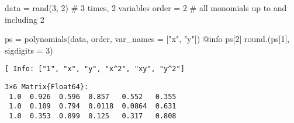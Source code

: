 \documentclass[
]{article}
\newenvironment{Shaded}{\begin{snugshade}}{\end{snugshade}}
\newcommand{\CommentTok}[1]{\textcolor[rgb]{0.37,0.37,0.37}{#1}}
\newcommand{\FloatTok}[1]{\textcolor[rgb]{0.68,0.00,0.00}{#1}}
\newcommand{\FunctionTok}[1]{\textcolor[rgb]{0.28,0.35,0.67}{#1}}
\newcommand{\NormalTok}[1]{\textcolor[rgb]{0.00,0.23,0.31}{#1}}
\newcommand{\OperatorTok}[1]{\textcolor[rgb]{0.37,0.37,0.37}{#1}}
\newcommand{\PreprocessorTok}[1]{\textcolor[rgb]{0.68,0.00,0.00}{#1}}
\newcommand{\StringTok}[1]{\textcolor[rgb]{0.13,0.47,0.30}{#1}}
\begin{document}
\begin{Shaded}
\begin{Highlighting}[]
\NormalTok{data }\OperatorTok{=} \FunctionTok{rand}\NormalTok{(}\FloatTok{3}\NormalTok{,  }\FloatTok{2}\NormalTok{) }\CommentTok{\# 3 times, 2 variables}
\NormalTok{order }\OperatorTok{=} \FloatTok{2} \CommentTok{\# all monomials up to and including 2}

\NormalTok{ps }\OperatorTok{=} \FunctionTok{polynomials}\NormalTok{(data, order, var\_names }\OperatorTok{=}\NormalTok{ [}\StringTok{"x"}\NormalTok{, }\StringTok{"y"}\NormalTok{])}
\PreprocessorTok{@info}\NormalTok{ ps[}\FloatTok{2}\NormalTok{]}
\FunctionTok{round}\NormalTok{.(ps[}\FloatTok{1}\NormalTok{], sigdigits }\OperatorTok{=} \FloatTok{3}\NormalTok{)}
\end{Highlighting}
\end{Shaded}

\begin{verbatim}
[ Info: ["1", "x", "y", "x^2", "xy", "y^2"]
\end{verbatim}

\begin{verbatim}
3×6 Matrix{Float64}:
 1.0  0.926  0.596  0.857   0.552   0.355
 1.0  0.109  0.794  0.0118  0.0864  0.631
 1.0  0.353  0.899  0.125   0.317   0.808
\end{verbatim}

\clearpage
\end{document}
